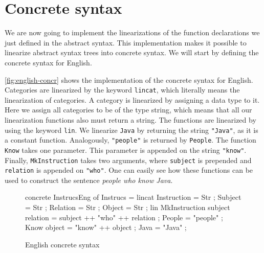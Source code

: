 

\section{Concrete syntax}

We are now going to implement the linearizations of the function declarations we just defined in the abstract syntax. This implementation makes it possible to linearize abstract syntax trees into concrete syntax. We will start by defining the concrete syntax for English.


\autoref{fig:english-concr} shows the implementation of the concrete syntax for English. Categories are linearized by the keyword \texttt{lincat}, which literally means the linearization of categories. A category is linearized by assigning a data type to it. Here we assign all categories to be of the type string, which means that all our linearization functions also must return a string. The functions are linearized by using the keyword \texttt{lin}. We linearize \texttt{Java} by returning the string \texttt{"Java"}, as it is a constant function. Analogously, \texttt{"people"} is returned by \texttt{People}. The function \texttt{Know} takes one parameter. This parameter is appended on the string \texttt{"know"}. Finally, \texttt{MkInstruction} takes two arguments, where \texttt{subject} is prepended and \texttt{relation} is appended on \texttt{"who"}. One can easily see how these functions can be used to construct the sentence \emph{people who know Java}.

\newenvironment{myfont}{\myfont}{\par}

\begin{figure}[H]
\begin{code}
concrete InstrucsEng of Instrucs = {
  lincat
    Instruction = Str ;
    Subject = Str ;
    Relation = Str ;
    Object = Str ;
  lin
    MkInstruction subject relation = subject ++ "who" ++ relation ;
    People = "people" ;
    Know object = "know" ++ object ;
    Java = "Java" ;
}
\end{code}
\caption{English concrete syntax\label{fig:english-concr}}
\end{figure}

